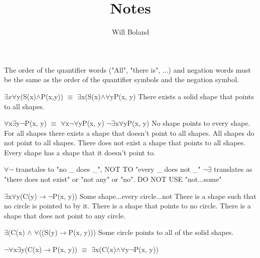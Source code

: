 \documentclass{article}
\begin{document}
\title{Notes}
\author{Will Boland}
\maketitle

The order of the quantifier words ("All", "there is", ...) and negation words must be the same as the order of the quantifier symbols and the negation symbol.\newline\newline

$\exists$$x$$\forall$y(S(x)$\wedge$P(x,y))\newline
$\equiv$ $\exists$x(S(x)$\wedge$$\forall$yP(x, y)\newline
There exists a solid shape that points to all shapes.\newline\newline

$\forall$x$\exists$y$ \neg$P(x, y) $\equiv$ $\forall$x$\neg$$\forall$yP(x, y) $\neg$$\exists$x$\forall$yP(x, y)\newline
No shape points to every shape.
For all shapes there exists a shape that doesn't point to all shapes.\newline
All shapes do not point to all shapes.\newline
There does not exist a shape that points to all shapes.\newline
Every shape has a shape that it doesn't point to.\newline\newline

$\forall$$\neg$ transtales to "no \_ does \_", NOT TO "every \_ does not \_"\newline
$\neg$$\exists$ translates as "there does not exist" or "not any" or "no". DO NOT USE "not...some"\newline\newline

$\exists$x$\forall$y(C(y)$\rightarrow$$\neg$P(x, y))\newline
Some shape...every circle...not\newline
There is a shape such that no circle is pointed to by it.\newline
There is a shape that points to no circle.\newline
There is a shape that does not point to any circle.\newline\newline

$\exists$(C(x) $\wedge$ $\forall$((S(y)$\rightarrow$P(x, y)))\newline
Some circle points to all of the solid shapes.\newline\newline

$\neg$$\forall$x$\exists$y(C(x)$\rightarrow$P(x, y)) $\equiv$ $\exists$x(C(x)$\wedge$$\forall$y$\neg$P(x, y))\newline




\enddocument
\end{document}
